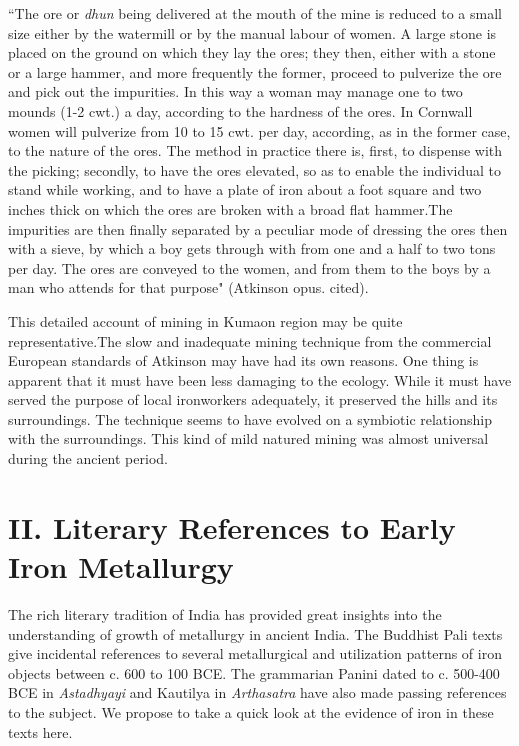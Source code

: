 ``The ore or {\it dhun} being delivered at the mouth of the mine is reduced to a small size either by the water­mill or by the manual labour of women. A large stone is placed on the ground on which they lay the ores; they then, either with a stone or a large hammer, and more frequently the former, proceed to pulverize the ore and pick out the impurities. In this way a woman may manage one to two mounds (1-2 cwt.) a day, according to the hardness of the ores. In Cornwall women will pulverize from 10 to 15 cwt. per day, according, as in the former case, to the nature of the ores. The method in practice there is, first, to dispense with the picking; secondly, to have the ores elevated, so as to enable the individual to stand while working, and to have a plate of iron about a foot square and two inches thick on which the ores are broken with a broad flat hammer.The impurities are then finally separated by a peculiar mode of dressing the ores then with a sieve, by which a boy gets through with from one and a half to two tons per day. The ores are conveyed to the women, and from them to the boys by a man who attends for that purpose" (Atkinson opus. cited).

This detailed account of mining in Kumaon region may be quite representative.The slow and inadequate mining technique from the commercial European standards of Atkinson may have had its own reasons. One thing is apparent that it must have been less damaging to the ecology. While it must have served the purpose of local ironworkers adequately, it preserved the hills and its surroundings. The technique seems to have evolved on a symbiotic relationship with the surroundings. This kind of mild natured mining was almost universal during the ancient period.

\vspace{-.4cm}

\section*{II. Literary References to Early Iron Metallurgy}\label{chapter4-section-3a}

\vspace{-.2cm}

The rich literary tradition of India has provided great insights into the understanding of growth of metallurgy in ancient India. The Buddhist Pali texts give incidental references to several metallurgical and utilization patterns of iron objects between c. 600 to 100 BCE. The grammarian Panini dated to c. 500-400 BCE in {\it Astadhyayi} and Kautilya in {\it Arthasatra} have also made passing references to the subject. We propose to take a quick look at the evidence of iron in these texts here.

